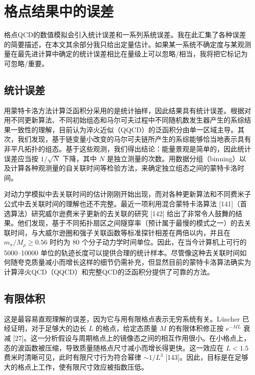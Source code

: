 
\chapter{格点结果中的误差}

格点QCD的数值模拟会引入统计误差和一系列系统误差。我在此汇集了各种误差的简要描述，在本文其余部分我只给出定量估计。如果某一系统不确定度与某观测量在最先进计算中确定的统计误差相比在量级上可以忽略/相当，我将把它标记为可忽略/重要。

\section{统计误差}

用蒙特卡洛方法计算泛函积分采用的是统计抽样，因此结果具有统计误差。根据对用不同更新算法、不同初始组态和马尔可夫过程中不同随机数发生器产生的系综结果一致性的理解，目前认为淬火近似（QQCD）的泛函积分由单一区域主导。其次，我们发现，基于链变量小改变的马尔可夫链所产生的系综能够恰当地表示具有非平凡拓扑的组态。基于这些观测，我们得出结论：能量景观是简单的，因此统计误差应当按 $1/\sqrt{N}$ 下降，其中 $N$ 是独立测量的次数。用数据分组（binning）以及计算各种观测量的自关联时间等检验方法，来确定独立组态之间的蒙特卡洛时间。

对动力学模拟中去关联时间的估计刚刚开始出现，而对各种更新算法和不同费米子公式中去关联时间的理解也还不完整。最近一项利用混合蒙特卡洛算法 [141]（首选算法）研究威尔逊费米子更新的去关联的研究 [142] 给出了非常令人鼓舞的结果。他们发现，基于不同拓扑扇区之间隧穿率（预计属于最慢的模式之一）的去关联时间，与大威尔逊圈和强子关联函数等标准探针相差在两倍以内，并且在 $m_\pi / M_\rho \ge 0.56$ 时约为 $80$ 个分子动力学时间单位。因此，在当今计算机上可行的 5000--10000 单位的轨迹长度可以提供合理的统计样本。尽管像这种去关联时间如何随夸克质量减小而增长这样的细节仍需补充，但显然目前的蒙特卡洛算法确实为计算淬火QCD（QQCD）和完整QCD的泛函积分提供了可靠的方法。

\section{有限体积}

这是最容易直观理解的误差，因为它与用有限格点表示无穷系统有关。L\"uscher 已经证明，对于足够大的边长 $L$ 的格点，给定态质量 $M$ 的有限体积修正按 $e^{-ML}$ 衰减 [27]。这一分析假设与周期格点上的镜像态之间的相互作用很小。在小格点上，态的波函数被压缩，导致质量随格点尺寸减小而增长得更快。这一效应在 $L < 1.5$ 费米时清晰可见，此时有限尺寸行为符合幂律 $\sim 1/L^3$ [143]。因此，目标是在足够大的格点上工作，使有限尺寸效应被指数压低。

